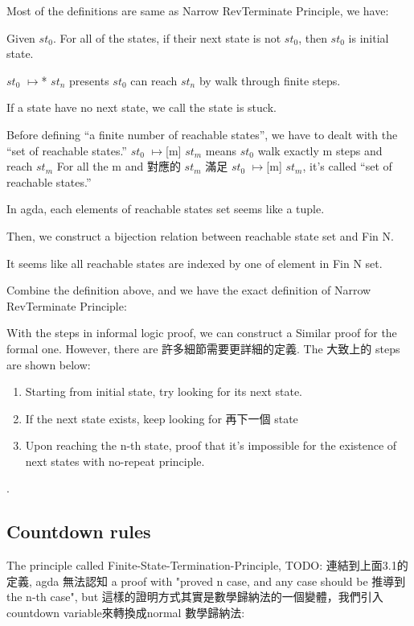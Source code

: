 Most of the definitions are same as Narrow RevTerminate Principle, we have:

Given $st_{0}$.  For all of the states, if their next state is not $st_{0}$, then $st_{0}$ is initial state.


$st_{0}$ $\mapsto$* $st_{n}$ presents $st_{0}$ can reach $st_{n}$ by walk through finite steps.


If a state have no next state, we call the state is stuck.


Before defining ``a finite number of reachable states'', we have to dealt with the ``set of reachable states.''
$st_{0}$ $\mapsto$[m] $st_{m}$ means $st_{0}$ walk exactly m steps and reach $st_{m}$
For all the m and 對應的 $st_{m}$ 滿足 $st_{0}$ $\mapsto$[m] $st_{m}$, it's called ``set of reachable states.''


In agda, each elements of reachable states set seems like a tuple. 


Then, we construct a bijection relation between reachable state set and Fin N.


It seems like all reachable states are indexed by one of element in Fin N set.


Combine the definition above, and we have the exact definition of Narrow RevTerminate Principle:








With the steps in informal logic proof, we can construct a Similar proof for the formal one.  However, there are 許多細節需要更詳細的定義.
The 大致上的 steps are shown below:
\begin{enumerate}[1.]
\item Starting from initial state, try looking for its next state. 
\item If the next state exists, keep looking for 再下一個 state
\item Upon reaching the n-th state, proof that it's impossible for the existence of next states with no-repeat principle.
\end{enumerate}.

\subsection{ Countdown rules }
The principle called Finite-State-Termination-Principle, {TODO: 連結到上面3.1的定義}, agda 無法認知 a proof with "proved n case, and any case should be 推導到 the n-th case", but 這樣的證明方式其實是數學歸納法的一個變體，我們引入countdown variable來轉換成normal 數學歸納法:

